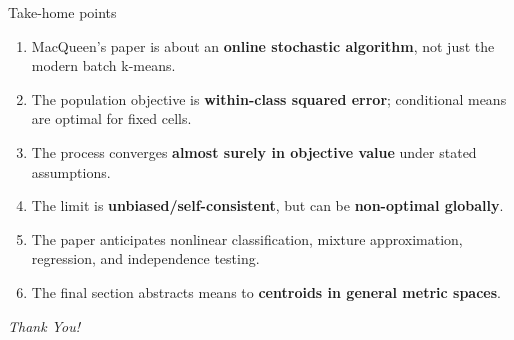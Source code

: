 \documentclass[10pt,compress]{beamer}
\begin{document}
\begin{frame}{Take-home points}
\small
\begin{enumerate}
\item MacQueen's paper is about an \textbf{online stochastic algorithm}, not just the modern batch k-means.
\item The population objective is \textbf{within-class squared error}; conditional means are optimal for fixed cells.
\item The process converges \textbf{almost surely in objective value} under stated assumptions.
\item The limit is \textbf{unbiased/self-consistent}, but can be \textbf{non-optimal globally}.
\item The paper anticipates nonlinear classification, mixture approximation, regression, and independence testing.
\item The final section abstracts means to \textbf{centroids in general metric spaces}.
\end{enumerate}
\end{frame}

\begin{frame}{}
\centering\Huge\emph{Thank You!}
\end{frame}
\end{document}
